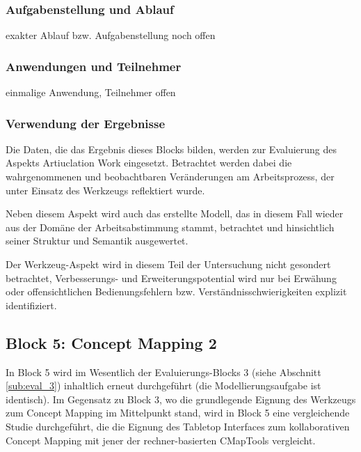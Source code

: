 
\subsubsection{Aufgabenstellung und Ablauf} %
\label{ssub:4_aufgabenstellung}

exakter Ablauf bzw. Aufgabenstellung noch offen


\subsubsection{Anwendungen und Teilnehmer} %
\label{ssub:4_teilnehmer}

einmalige Anwendung, Teilnehmer offen 


\subsubsection{Verwendung der Ergebnisse} %
\label{ssub:4_verwendung_der_ergebnisse}

Die Daten, die das Ergebnis dieses Blocks bilden, werden zur Evaluierung des Aspekts Artiuclation Work eingesetzt. Betrachtet werden dabei die wahrgenommenen und beobachtbaren Veränderungen am Arbeitsprozess, der unter Einsatz des Werkzeugs reflektiert wurde.

Neben diesem Aspekt wird auch das erstellte Modell, das in diesem Fall wieder aus der Domäne der Arbeitsabstimmung stammt, betrachtet und hinsichtlich seiner Struktur und Semantik ausgewertet. 

Der Werkzeug-Aspekt wird in diesem Teil der Untersuchung nicht gesondert betrachtet, Verbesserungs- und Erweiterungspotential wird nur bei Erwähung oder offensichtlichen Bedienungsfehlern bzw. Verständnisschwierigkeiten explizit identifiziert.


\subsection{Block 5: Concept Mapping 2}
\label{sub:eval_5}

In Block 5 wird im Wesentlich der Evaluierungs-Blocks 3 (siehe Abschnitt \ref{sub:eval_3})   inhaltlich erneut durchgeführt (die Modellierungsaufgabe ist identisch). Im Gegensatz zu Block 3, wo die grundlegende Eignung des Werkzeugs zum Concept Mapping im Mittelpunkt stand, wird in Block 5 eine vergleichende Studie durchgeführt, die die Eignung des Tabletop Interfaces zum kollaborativen Concept Mapping mit jener der rechner-basierten CMapTools \citep{Canas04} vergleicht.

